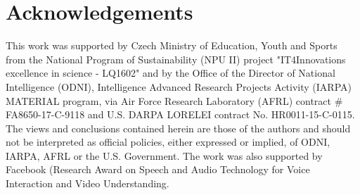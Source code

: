 \documentclass[a4paper]{article}
\begin{document}
\section{Acknowledgements}
This work was supported by Czech Ministry of Education, Youth and Sports from the National Program of Sustainability (NPU II) project "IT4Innovations excellence in science - LQ1602" and by the Office of the Director of National Intelligence (ODNI), Intelligence Advanced Research Projects Activity (IARPA) MATERIAL program, via Air Force Research Laboratory (AFRL) contract \# FA8650-17-C-9118 and U.S. DARPA LORELEI contract No. HR0011-15-C-0115. The views and conclusions contained herein are those of the authors and should not be interpreted as official policies, either expressed or implied, of ODNI, IARPA, AFRL or the U.S. Government. The work was also supported by Facebook (Research Award on Speech and Audio Technology for Voice Interaction and Video Understanding.



{}
\end{document}
